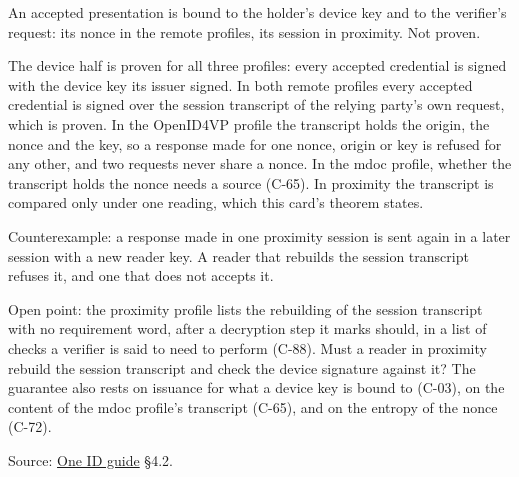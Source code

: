 \begin{theorem}
  \label{thm:g02}
  An accepted presentation is bound to the holder's device key and to the
  verifier's request: its nonce in the remote profiles, its session in
  proximity.  Not proven.

  The device half is proven for all three profiles: every accepted credential
  is signed with the device key its issuer signed.  In both remote profiles
  every accepted credential is signed over the session transcript of the
  relying party's own request, which is proven.  In the OpenID4VP profile the
  transcript holds the origin, the nonce and the key, so a response made for
  one nonce, origin or key is refused for any other, and two requests never
  share a nonce.  In the mdoc profile, whether the transcript holds the nonce
  needs a source (C-65).  In proximity the transcript is compared only under
  one reading, which this card's theorem states.

  Counterexample: a response made in one proximity session is sent again in a
  later session with a new reader key.  A reader that rebuilds the session
  transcript refuses it, and one that does not accepts it.

  Open point: the proximity profile lists the rebuilding of the session
  transcript with no requirement word, after a decryption step it marks
  should, in a list of checks a verifier is said to need to perform (C-88).
  Must a reader in proximity rebuild the session transcript and check the
  device signature against it?  The guarantee also rests on issuance for what
  a device key is bound to (C-03), on the content of the mdoc profile's
  transcript (C-65), and on the entropy of the nonce (C-72).

  Source:
  \href{https://standards.atlassian.net/wiki/spaces/OneID/pages/2947416082/Technical+Implementation+Guide}{One ID guide} §4.2.
\end{theorem}

